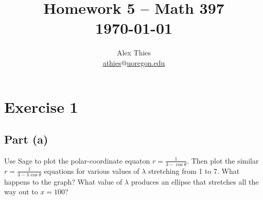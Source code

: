 \documentclass[letterpaper, 12pt]{amsart}
\theoremstyle{definition}  							%
\begin{document}
	\title{Homework 5  -- Math 397 \\ \today}
	\author{Alex Thies \\ \href{mailto:athies@uoregon.edu}{\lowercase{athies$@$uoregon.edu}}}

	\maketitle

	\section*{Exercise 1}
		\subsection*{Part (a)}
		Use Sage to plot the polar-coordinate equaton $r = \tfrac{1}{3-\cos\theta}$. 
		Then plot the similar $r = \tfrac{1}{3-\lambda\cos\theta}$ equations for various values of $\lambda$ stretching from 1 to 7. 
		What happens to the graph? 
		What value of $\lambda$ produces an ellipse that stretches all the way out to $x = 100$?
\end{document}
